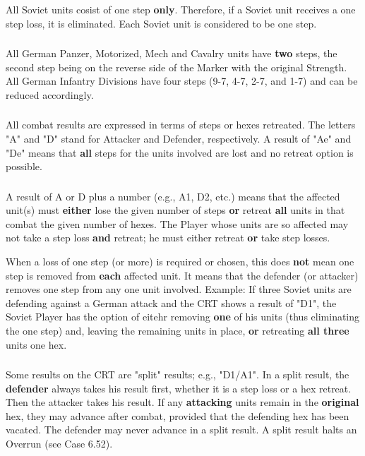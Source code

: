 \subsubsection{} All Soviet units cosist of one step \textbf{only}. Therefore, if a Soviet unit receives a one step loss, it is eliminated. Each Soviet unit is considered to be one step.

\subsubsection{} All German Panzer, Motorized, Mech and Cavalry units have \textbf{two} steps, the second step being on the reverse side of the Marker with the original Strength. All German Infantry Divisions have four steps (9-7, 4-7, 2-7, and 1-7) and can be reduced accordingly.

\subsubsection{} All combat results are expressed in terms of steps or hexes retreated. The letters "A" and "D" stand for Attacker and Defender, respectively. A result of "Ae" and "De" means that \textbf{all} steps for the units involved are lost and no retreat option is possible.

\subsubsection{} A result of A or D plus a number (e.g., A1, D2, etc.) means that the affected unit(s) must \textbf{either} lose the given number of steps \textbf{or} retreat \textbf{all} units in that combat the given number of hexes. The Player whose units are so affected may not take a step loss \textbf{and} retreat; he must either retreat \textbf{or} take step losses.

When a loss of one step (or more) is required or chosen, this does \textbf{not} mean one step is removed from \textbf{each} affected unit. It means that the defender (or attacker) removes one step from any one unit involved. Example: If three Soviet units are defending against a German attack and the CRT shows a result of "D1", the Soviet Player has the option of eitehr removing \textbf{one} of his units (thus eliminating the one step) and, leaving the remaining units in place, \textbf{or} retreating \textbf{all three} units one hex.

\subsubsection{} Some results on the CRT are "split" results; e.g., "D1/A1". In a split result, the \textbf{defender} always takes his result first, whether it is a step loss or a hex retreat. Then the attacker takes his result. If any \textbf{attacking} units remain in the \textbf{original} hex, they may advance after combat, provided that the defending hex has been vacated. The defender may never advance in a split result. A split result halts an Overrun (see Case 6.52).

